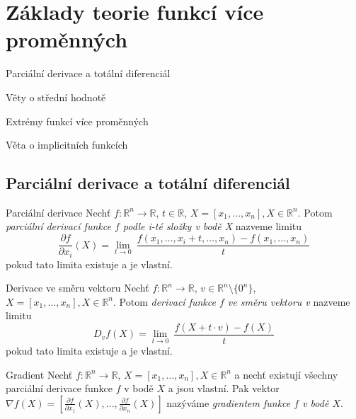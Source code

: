 \section{Základy teorie funkcí více proměnných}

\begin{pozadavky}
\begin{pitemize}
	\item Parciální derivace a totální diferenciál
	\item Věty o střední hodnotě
	\item Extrémy funkcí více proměnných
	\item Věta o implicitních funkcích
\end{pitemize}
\end{pozadavky}

\subsection{Parciální derivace a totální diferenciál}

\begin{definiceN}{Parciální derivace}
Nechť $f: \mathbb{R}^n \rightarrow \mathbb{R}$, $t \in \mathbb{R}$, $X = [x_1, \ldots, x_n], X \in \mathbb{R}^n$. Potom \textit{parciální derivací funkce $f$ podle i-té složky v bodě X} nazveme limitu
$$\frac{\partial f}{\partial x_i}(X) = \displaystyle\lim_{t \rightarrow 0}~\frac{f(x_1,\ldots,x_i + t,\ldots,x_n) - f(x_1,\ldots,x_n)}{t}$$
pokud tato limita existuje a je vlastní.
\end{definiceN}

\begin{definiceN}{Derivace ve směru vektoru}
Nechť $f: \mathbb{R}^n \rightarrow \mathbb{R}$, $v \in \mathbb{R}^n\setminus\{0^n\}$, $X = [x_1, \ldots, x_n], X \in \mathbb{R}^n$. Potom \textit{derivací funkce $f$ ve směru vektoru v} nazveme limitu
$$D_vf(X) = \displaystyle\lim_{t \rightarrow 0}~\frac{f(X + t \cdot v) - f(X)}{t}$$
pokud tato limita existuje a je vlastní.
\end{definiceN}

\begin{definiceN}{Gradient}
Nechť $f: \mathbb{R}^n \rightarrow \mathbb{R}$, $X = [x_1, \ldots, x_n], X \in \mathbb{R}^n$ a nechť existují všechny parciální derivace funkce $f$ v bodě $X$ a jsou vlastní. Pak vektor $\nabla f(X) = [\frac{\partial f}{\partial x_1}(X),\ldots,\frac{\partial f}{\partial x_n}(X)]$ nazýváme \textit{gradientem funkce $f$ v bodě $X$}.
\end{definiceN}


